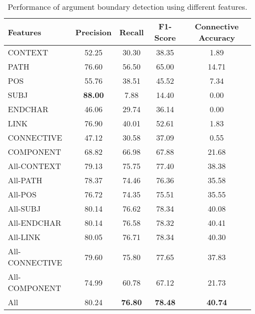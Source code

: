\begin{table}[ht]
\centering
\begin{tabular}{|l|c|c|c|c|}
\hline

\bf Features        & \bf Precision & \bf Recall & \bf F1-Score & \bf Connective Accuracy \\ \hline
    CONTEXT         &     52.25     &     30.30  &     38.35    &      1.89               \\ \hline
    PATH            &     76.60     &     56.50  &     65.00    &     14.71               \\ \hline
    POS             &     55.76     &     38.51  &     45.52    &      7.34               \\ \hline
    SUBJ            & \bf 88.00     &      7.88  &     14.40    &      0.00               \\ \hline
    ENDCHAR         &     46.06     &     29.74  &     36.14    &      0.00               \\ \hline
    LINK            &     76.90     &     40.01  &     52.61    &      1.83               \\ \hline
    CONNECTIVE      &     47.12     &     30.58  &     37.09    &      0.55               \\ \hline
    COMPONENT       &     68.82     &     66.98  &     67.88    &     21.68               \\ \hline
    All-CONTEXT     &     79.13     &     75.75  &     77.40    &     38.38               \\ \hline
    All-PATH        &     78.37     &     74.46  &     76.36    &     35.58               \\ \hline
    All-POS         &     76.72     &     74.35  &     75.51    &     35.55               \\ \hline
    All-SUBJ        &     80.14     &     76.62  &     78.34    &     40.08               \\ \hline
    All-ENDCHAR     &     80.14     &     76.58  &     78.32    &     40.41               \\ \hline
    All-LINK        &     80.05     &     76.71  &     78.34    &     40.30               \\ \hline
    All-CONNECTIVE  &     79.60     &     75.80  &     77.65    &     37.83               \\ \hline
    All-COMPONENT   &     74.99     &     60.78  &     67.12    &     21.73               \\ \hline
    All             &     80.24     & \bf 76.80  & \bf 78.48    & \bf 40.74               \\ \hline

\end{tabular}
\caption{\label{t:argument-features} Performance of argument boundary detection
using different features. }
\end{table}

